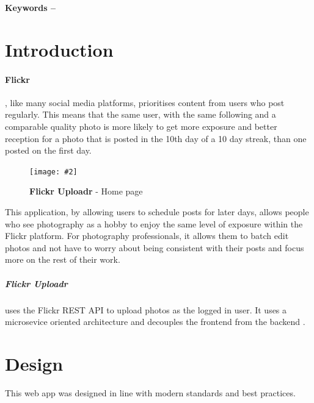 \documentclass[10pt, a4paper]{article}
\title{\mytitle}
\author{\myauthor\hspace{1em}\\\contact\\Edinburgh Napier University\hspace{0.5em}-\hspace{0.5em}\mymodule}
\date{}
\newcommand{\figuremacro}[5]{
\begin{figure}[#1]
\centering
\texttt{[image: \#2]}
\caption[#3]{\textbf{#3}#4}
\label{fig:#2}
\end{figure}
}
\begin{document}
\maketitle
\begin{abstract}
        Flickr Uploadr is an application that allows users of the photography oriented platform Flickr to schedule photos to be uploaded at a later date. The users conenct their flickr account to the app and can schedule photos to be uploaded and can change the title, description and tags of a photo.
        \end{abstract}

        \textbf{Keywords -- }{\mykeywords}

        \section{Introduction}
        \paragraph{Flickr \cite{Flickr}}, like many social media platforms, prioritises content from users who post regularly. This means that the same user, with the same following and a comparable quality photo is more likely to get more exposure and better reception for a photo that is posted in the 10th day of a 10 day streak, than one posted on the first day.

        \figuremacro{h}{home}{Flickr Uploadr}{ - Home page}{1.0}

        This application, by allowing users to schedule posts for later days, allows people who see photography as a hobby to enjoy the same level of exposure within the Flickr platform. For photography professionals, it allows them to batch edit photos and not have to worry about being consistent with their posts and focus more on the rest of their work.

        \subparagraph{Flickr Uploadr} uses the Flickr REST API \cite{Flickr_Services} to upload photos as the logged in user.
        It uses a microsevice oriented architecture and decouples the frontend from the backend \cite{Microservices_and_SPAs_2017}.

        \section{Design}
        This web app was designed in line with modern standards and best practices.
\end{document}
